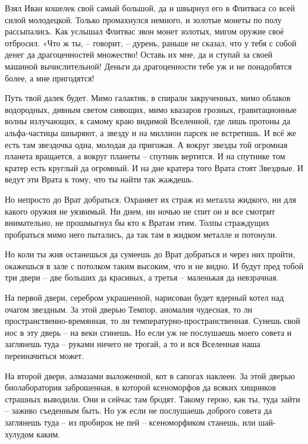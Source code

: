 \documentclass[ebook,oneside,final,openright]{memoir}
\begin{document}
\par
Взял Иван кошелек свой самый большой, да и швырнул его в Флитваса со всей силой молодецкой. Только промахнулся немного, и золотые монеты по полу рассыпались. Как услышал Флитвас звон монет золотых, мигом оружие своё отбросил. «Что ж ты, – говорит, – дурень, раньше не сказал, что у тебя с собой денег да драгоценностей множество! Оставь их мне, да и ступай за своей машиной вычислительной! Деньги да драгоценности тебе уж и не понадобятся более, а мне пригодятся!\par
\par
Путь твой далек будет. Мимо галактик, в спирали закрученных, мимо облаков водородных, дивным светом сияющих, мимо квазаров грозных, гравитационные волны излучающих, к самому краю видимой Вселенной, где лишь протоны да альфа-частицы шныряют, а звезду и на миллион парсек не встретишь. И всё же есть там звездочка одна, молодая да пригожая. А вокруг звезды той огромная планета вращается, а вокруг планеты – спутник вертится. И на спутнике том кратер есть круглый да огромный. И на дне кратера того Врата стоят Звездные. И ведут эти Врата к тому, что ты найти так жаждешь.\par
\par
Но непросто до Врат добраться. Охраняет их страж из металла жидкого, ни для какого оружия не уязвимый. Ни днем, ни ночью не спит он и все смотрит внимательно, не прошмыгнул бы кто к Вратам этим. Толпы страждущих пробраться мимо него пытались, да так там в жидком металле и потонули.\par
\par
Но коли ты жив останешься да сумеешь до Врат добраться и через них пройти, окажешься в зале с потолком таким высоким, что и не видно. И будут пред тобой три двери – две больших да красивых, а третья – маленькая да невзрачная.\par
\par
На первой двери, серебром украшенной, нарисован будет ядерный котел над очагом звездным. За этой дверью Темпор, аномалия чудесная, то ли пространственно-времянная, то ли температурно-пространственная. Сунешь свой нос в эту дверь – на веки сгинешь. Но если уж не послушаешь моего совета и заглянешь туда – руками ничего не трогай, а то и вся Вселенная наша переиначиться может.\par
\par
На второй двери, алмазами выложенной, кот в сапогах наклеен. За этой дверью биолаборатория заброшенная, в которой ксеноморфов да всяких хищников страшных выводили. Они и сейчас там бродят. Такому герою, как ты, туда зайти – заживо съеденным быть. Но уж если не послушаешь доброго совета да заглянешь туда – из пробирок не пей – ксеноморфиком станешь, или шай-хулудом каким.\par
\end{document}
